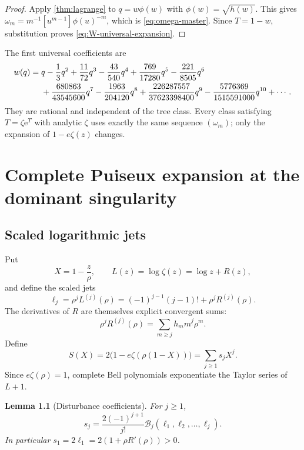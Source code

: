\documentclass[11pt,a4paper,oneside,openany]{book}
\newtheorem{lemma}[theorem]{Lemma}
\theoremstyle{definition}
\theoremstyle{remark}
\newcommand{\e}{\mathrm e}
\newcommand{\Bell}[1]{\mathcal B_{#1}}
\newcommand{\falling}[2]{#1^{\underline{#2}}}
\begin{document}
\begin{proof}
Apply \cref{thm:lagrange} to $q=w\phi(w)$ with
$\phi(w)=\sqrt{h(w)}$.  This gives
$\omega_m=m^{-1}[u^{m-1}]\phi(u)^{-m}$, which is
\cref{eq:omega-master}.  Since $T=1-w$, substitution proves
\cref{eq:W-universal-expansion}.
\end{proof}

The first universal coefficients are
\begin{align}
 w(q)={}&q-\frac13q^2+\frac{11}{72}q^3-\frac{43}{540}q^4
 +\frac{769}{17280}q^5-\frac{221}{8505}q^6\notag\\
 &+\frac{680863}{43545600}q^7-\frac{1963}{204120}q^8
 +\frac{226287557}{37623398400}q^9
 -\frac{5776369}{1515591000}q^{10}+\cdots .
 \label{eq:omega-first}
\end{align}
They are rational and independent of the tree class.  Every class satisfying
$T=\zeta\e^T$ with analytic $\zeta$ uses exactly the same sequence
$(\omega_m)$; only the expansion of $1-e\zeta(z)$ changes.

\chapter{Complete Puiseux expansion at the dominant singularity}
\label{ch:puiseux}

\section{Scaled logarithmic jets}
Put
\begin{equation}
 X=1-\frac z\rho,
 \qquad
 L(z)=\log\zeta(z)=\log z+R(z),
 \label{eq:X-L}
\end{equation}
and define the scaled jets
\begin{equation}
 \ell_j=\rho^jL^{(j)}(\rho)
 =(-1)^{j-1}(j-1)!+\rho^jR^{(j)}(\rho).
 \label{eq:ell-jets}
\end{equation}
The derivatives of $R$ are themselves explicit convergent sums:
\begin{equation}
 \rho^jR^{(j)}(\rho)
 =\sum_{m\ge j}h_m\falling mj\rho^m.
 \label{eq:R-derivative-sum}
\end{equation}
Define
\begin{equation}
 S(X)=2\bigl(1-e\zeta(\rho(1-X))\bigr)
     =\sum_{j\ge1}s_jX^j.
 \label{eq:S-def}
\end{equation}
Since $e\zeta(\rho)=1$, complete Bell polynomials exponentiate the Taylor
series of $L+1$.

\begin{lemma}[Disturbance coefficients]
\label{lem:sj}
For $j\ge1$,
\begin{equation}
 \boxed{
 s_j=\frac{2(-1)^{j+1}}{j!}
 \Bell j(\ell_1,\ell_2,\ldots,\ell_j).}
 \label{eq:sj-bell}
\end{equation}
In particular $s_1=2\ell_1=2(1+\rho R'(\rho))>0$.
\end{lemma}
\end{document}
